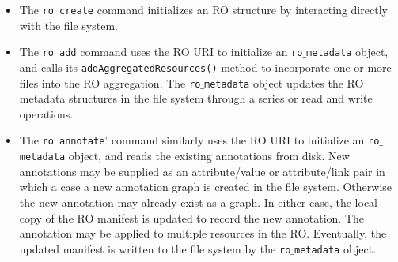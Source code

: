 \begin{itemize}

\item The \texttt{ro create} command initializes an RO structure by interacting directly with the file system.

\item The \texttt{ro add} command uses the RO URI to initialize an \texttt{ro$\_$metadata} object, and calls its \texttt{addAggregatedResources()} method to incorporate one or more files into the RO aggregation. The \texttt{ro$\_$metadata} object updates the RO metadata structures in the file system through a series or read and write operations.

\item The \texttt{ro annotate}' command similarly uses the RO URI to initialize an \texttt{ro$\_$metadata} object, and reads the existing annotations from disk. New annotations may be supplied as an attribute/value or attribute/link pair in which a case a new annotation graph is created in the file system. Otherwise the new annotation may already exist as a graph. In either case, the local copy of the RO manifest is updated to record the new annotation. The annotation may be applied to multiple resources in the RO. Eventually, the updated manifest is written to the file system by the \texttt{ro$\_$metadata} object.
\end{itemize}






